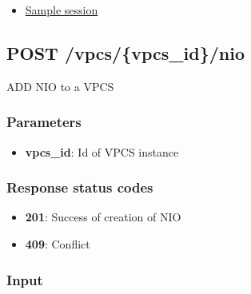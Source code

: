 \documentclass[letterpaper,10pt,english]{sphinxmanual}
\begin{document}
{\begin{minipage}{0.95\linewidth}
\begin{itemize}
\begin{itemize}
\begin{itemize}
\begin{itemize}
\begin{itemize}
\end{itemize}

\item {} 
{\hyperref[api/vpcsvpcsidnio:body]{Body}}

\end{itemize}

\item {} 
{\hyperref[api/vpcsvpcsidnio:sample-session]{Sample session}}

\end{itemize}

\end{itemize}

\end{itemize}
\end{minipage}}
\begin{center}\setlength{\fboxsep}{5pt}\end{center}


\subsection{POST /vpcs/\{vpcs\_id\}/nio}
\label{api/vpcsvpcsidnio:post-vpcs-vpcs-id-nio}
ADD NIO to a VPCS


\subsubsection{Parameters}
\label{api/vpcsvpcsidnio:parameters}\begin{itemize}
\item {} 
\textbf{vpcs\_id}: Id of VPCS instance

\end{itemize}


\subsubsection{Response status codes}
\label{api/vpcsvpcsidnio:response-status-codes}\begin{itemize}
\item {} 
\textbf{201}: Success of creation of NIO

\item {} 
\textbf{409}: Conflict

\end{itemize}


\subsubsection{Input}
\label{api/vpcsvpcsidnio:input}
\end{document}
